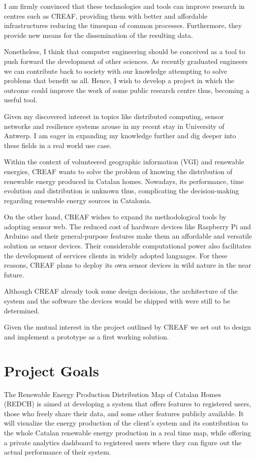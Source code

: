 I am firmly convinced that these technologies and tools can improve research in centres such as CREAF, providing them with better and affordable infrastructures reducing the timespan of common processes. Furthermore, they provide new means for the dissemination of the resulting data.

Nonetheless, I think that computer engineering should be conceived as a tool to push forward the development of other sciences. As recently graduated engineers we can contribute back to society with our knowledge attempting to solve problems that benefit us all. Hence, I wish to develop a project in which the outcome could improve the work of some public research centre thus, becoming a useful tool.

Given my discovered interest in topics like distributed computing, sensor networks and resilience systems arouse in my recent stay in University of Antwerp. I am eager in expanding my knowledge further and dig deeper into these fields in a real world use case.

Within the context of volunteered geographic information (VGI) and renewable energies, CREAF wants to solve the problem of knowing the distribution of renewable energy produced in Catalan homes. Nowadays, its performance, time evolution and distribution is unknown thus, complicating the decision-making regarding renewable energy sources in Catalonia.

On the other hand, CREAF wishes to expand its methodological tools by adopting sensor web. The reduced cost of hardware devices like Raspberry Pi and Arduino  and their general-purpose features make them an affordable and versatile solution as sensor devices. Their considerable computational power also facilitates the development of services clients in widely adopted languages. For these reasons, CREAF plans to deploy its own sensor devices in wild nature in the near future. 

Although CREAF already took some design decisions, the architecture of the system and the software the devices would be shipped with were still to be determined.

Given the mutual interest in the project outlined by CREAF we set out to design and implement a prototype as a first working solution.

\section{Project Goals}

The Renewable Energy Production Distribution Map of Catalan Homes (REDCH) is aimed at developing a system that offers features to registered users, those who freely share their data, and some other features publicly available. It will visualize the energy production of the client’s system and its contribution to the whole Catalan renewable energy production in a real time map, while offering a private analytics dashboard to registered users where they can figure out the actual performance of their system.

